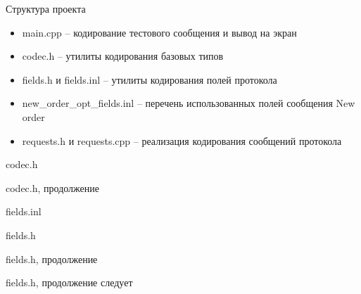 \documentclass[unknownkeysallowed,xcolor=table]{beamer}
\makeatletter
\newcommand{\srcmediumsize}{\@setfontsize{\srcmediumsize}{7pt}{7pt}}
\newcommand{\srcbigsize}{\@setfontsize{\srcbigsize}{8pt}{8pt}}
\newcommand{\srcsize}{\@setfontsize{\srcsize}{6pt}{6pt}}
\makeatother
\begin{document}
\begin{frame}{Структура проекта}
\begin{itemize}
  \item main.cpp -- кодирование тестового сообщения и вывод на экран \vspace{0.5em}
  \item codec.h -- утилиты кодирования базовых типов \vspace{0.5em}
  \item fields.h и fields.inl -- утилиты кодирования полей протокола \vspace{0.5em}
  \item new\_order\_opt\_fields.inl -- перечень использованных полей сообщения New order \vspace{0.5em}
  \item requests.h и requests.cpp -- реализация кодирования сообщений протокола
\end{itemize}
\end{frame}

\begin{frame}[fragile]{codec.h}

\end{frame}

\begin{frame}[fragile]{codec.h, продолжение}

\end{frame}

\begin{frame}[fragile]{fields.inl}

\end{frame}

\begin{frame}[fragile]{fields.h}

\end{frame}

\begin{frame}[fragile]{fields.h, продолжение}

\end{frame}

\begin{frame}[fragile]{fields.h, продолжение следует}

\end{frame}
\end{document}
